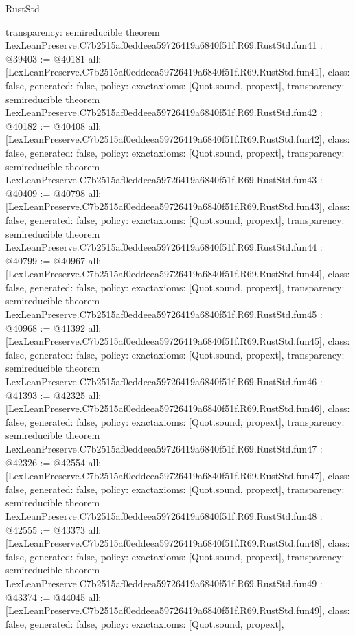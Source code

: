 \begin{lexlean}{RustStd}
\begin{coremodule}
{  transparency: semireducible
}
theorem LexLeanPreserve.C7b2515af0eddeea59726419a6840f51f.R69.RustStd.fun41 : @39403 := @40181 {
  all: [LexLeanPreserve.C7b2515af0eddeea59726419a6840f51f.R69.RustStd.fun41],
  class: false,
  generated: false,
  policy: exact{axioms: [Quot.sound, propext]},
  transparency: semireducible
}
theorem LexLeanPreserve.C7b2515af0eddeea59726419a6840f51f.R69.RustStd.fun42 : @40182 := @40408 {
  all: [LexLeanPreserve.C7b2515af0eddeea59726419a6840f51f.R69.RustStd.fun42],
  class: false,
  generated: false,
  policy: exact{axioms: [Quot.sound, propext]},
  transparency: semireducible
}
theorem LexLeanPreserve.C7b2515af0eddeea59726419a6840f51f.R69.RustStd.fun43 : @40409 := @40798 {
  all: [LexLeanPreserve.C7b2515af0eddeea59726419a6840f51f.R69.RustStd.fun43],
  class: false,
  generated: false,
  policy: exact{axioms: [Quot.sound, propext]},
  transparency: semireducible
}
theorem LexLeanPreserve.C7b2515af0eddeea59726419a6840f51f.R69.RustStd.fun44 : @40799 := @40967 {
  all: [LexLeanPreserve.C7b2515af0eddeea59726419a6840f51f.R69.RustStd.fun44],
  class: false,
  generated: false,
  policy: exact{axioms: [Quot.sound, propext]},
  transparency: semireducible
}
theorem LexLeanPreserve.C7b2515af0eddeea59726419a6840f51f.R69.RustStd.fun45 : @40968 := @41392 {
  all: [LexLeanPreserve.C7b2515af0eddeea59726419a6840f51f.R69.RustStd.fun45],
  class: false,
  generated: false,
  policy: exact{axioms: [Quot.sound, propext]},
  transparency: semireducible
}
theorem LexLeanPreserve.C7b2515af0eddeea59726419a6840f51f.R69.RustStd.fun46 : @41393 := @42325 {
  all: [LexLeanPreserve.C7b2515af0eddeea59726419a6840f51f.R69.RustStd.fun46],
  class: false,
  generated: false,
  policy: exact{axioms: [Quot.sound, propext]},
  transparency: semireducible
}
theorem LexLeanPreserve.C7b2515af0eddeea59726419a6840f51f.R69.RustStd.fun47 : @42326 := @42554 {
  all: [LexLeanPreserve.C7b2515af0eddeea59726419a6840f51f.R69.RustStd.fun47],
  class: false,
  generated: false,
  policy: exact{axioms: [Quot.sound, propext]},
  transparency: semireducible
}
theorem LexLeanPreserve.C7b2515af0eddeea59726419a6840f51f.R69.RustStd.fun48 : @42555 := @43373 {
  all: [LexLeanPreserve.C7b2515af0eddeea59726419a6840f51f.R69.RustStd.fun48],
  class: false,
  generated: false,
  policy: exact{axioms: [Quot.sound, propext]},
  transparency: semireducible
}
theorem LexLeanPreserve.C7b2515af0eddeea59726419a6840f51f.R69.RustStd.fun49 : @43374 := @44045 {
  all: [LexLeanPreserve.C7b2515af0eddeea59726419a6840f51f.R69.RustStd.fun49],
  class: false,
  generated: false,
  policy: exact{axioms: [Quot.sound, propext]},
}
\end{coremodule}
\end{lexlean}
